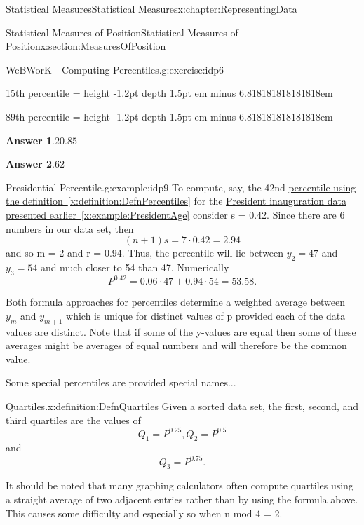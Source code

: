 \documentclass[oneside,10pt,]{book}
\newcommand{\blocktitlefont}{\relax}
\newcommand{\xreffont}{\relax}
\newcommand{\fillin}[1]{\leavevmode\leaders\vrule height -1.2pt depth 1.5pt \hskip #1em minus #1em \null}
\numberwithin{equation}{section}
\begin{document}
\begin{chapterptx}{Statistical Measures}{}{Statistical Measures}{}{}{x:chapter:RepresentingData}
\begin{sectionptx}{Statistical Measures of Position}{}{Statistical Measures of Position}{}{}{x:section:MeasuresOfPosition}
\begin{inlineexercise}{WeBWorK - Computing Percentiles.}{g:exercise:idp6}
\par
15th percentile = \fillin{6.818181818181818}%
\par
89th percentile = \fillin{6.818181818181818}%
\par\smallskip%
\noindent\textbf{\blocktitlefont Answer 1}.\hypertarget{g:answer:idp7}{}\quad{}\(20.85\)%
\par\smallskip%
\noindent\textbf{\blocktitlefont Answer 2}.\hypertarget{g:answer:idp8}{}\quad{}\(62\)%
\end{inlineexercise}%
\begin{example}{Presidential Percentile.}{g:example:idp9}%
To compute, say, the 42nd \hyperref[x:definition:DefnPercentiles]{percentile using the definition~{\xreffont\ref{x:definition:DefnPercentiles}}} for the \hyperref[x:example:PresidentAge]{President inauguration data presented earlier~{\xreffont\ref{x:example:PresidentAge}}} consider s = 0.42. Since there are 6 numbers in our data set, then%
\begin{equation*}
(n+1)s = 7 \cdot 0.42 = 2.94
\end{equation*}
and so m = 2 and r = 0.94.  Thus, the percentile will lie between \(y_2 = 47\) and \(y_3 = 54\) and much closer to 54 than 47.  Numerically%
\begin{equation*}
P^{0.42} = 0.06 \cdot 47 + 0.94 \cdot 54 = 53.58.
\end{equation*}
%
\end{example}
Both formula approaches for percentiles determine a weighted average between \(y_m\) and \(y_{m+1}\) which is unique for distinct values of p provided each of the data values are distinct. Note that if some of the y-values are equal then some of these averages might be averages of equal numbers and will therefore be the common value.%
\par
Some special percentiles are provided special names...%
\begin{definition}{Quartiles.}{x:definition:DefnQuartiles}%
Given a sorted data set, the first, second, and third quartiles are the values of%
\begin{equation*}
Q_1 = P^{0.25}, Q_2 = P^{0.5}
\end{equation*}
and%
\begin{equation*}
Q_3 = P^{0.75}.
\end{equation*}
%
\end{definition}
It should be noted that many graphing calculators often compute quartiles using a straight average of two adjacent entries rather than by using the formula above. This causes some difficulty and especially so when n mod 4 = 2.%

\end{sectionptx}
\end{chapterptx}
\end{document}
